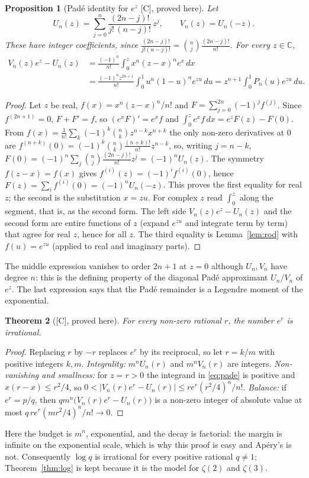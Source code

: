 \documentclass[11pt,a4paper]{article}
\newcommand{\C}{\mathbb C}
\newcommand{\dd}{\,d}
\newcommand{\st}[1]{\textsf{[#1]}}
\newtheorem{theorem}{Theorem}
\newtheorem{proposition}[theorem]{Proposition}
\theoremstyle{definition}
\begin{document}
\begin{proposition}[Pad\'e identity for $e^z$ \st{C}, proved here]\label{prop:pade}
Let
\[
U_n(z)=\sum_{j=0}^n\frac{(2n-j)!}{j!\,(n-j)!}\,z^j,\qquad V_n(z)=U_n(-z).
\]
These have integer coefficients, since $\frac{(2n-j)!}{j!(n-j)!}=\binom nj\frac{(2n-j)!}{n!}$. For
every $z\in\C$,
\begin{equation}\label{eq:pade}
\begin{aligned}
V_n(z)e^z-U_n(z)
 &=\frac{(-1)^n}{n!}\int_0^z x^n(z-x)^ne^x\dd x\\
 &=\frac{(-1)^nz^{2n+1}}{n!}\int_0^1u^n(1-u)^ne^{zu}\dd u
 =z^{n+1}\int_0^1P_n(u)e^{zu}\dd u .
\end{aligned}
\end{equation}
\end{proposition}
\begin{proof}
Let $z$ be real, $f(x)=x^n(z-x)^n/n!$ and $F=\sum_{j=0}^{2n}(-1)^jf^{(j)}$. Since $f^{(2n+1)}=0$,
$F+F'=f$, so $(e^xF)'=e^xf$ and $\int_0^ze^xf\dd x=e^zF(z)-F(0)$. From
$f(x)=\frac1{n!}\sum_k(-1)^k\binom nkz^{n-k}x^{n+k}$ the only non-zero derivatives at $0$ are
$f^{(n+k)}(0)=(-1)^k\binom nk\frac{(n+k)!}{n!}z^{n-k}$, so, writing $j=n-k$,
$F(0)=(-1)^n\sum_j\binom nj\frac{(2n-j)!}{n!}z^j=(-1)^nU_n(z)$.
The symmetry $f(z-x)=f(x)$ gives $f^{(i)}(z)=(-1)^if^{(i)}(0)$, hence
$F(z)=\sum_if^{(i)}(0)=(-1)^nU_n(-z)$. This proves the first equality for real $z$; the second is
the substitution $x=zu$. For complex $z$ read $\int_0^z$ along the segment, that is, as the second form. The left side
$V_n(z)e^z-U_n(z)$ and the second form are entire functions of $z$ (expand $e^{zu}$ and integrate term
by term) that agree for real $z$, hence for all $z$. The third equality is Lemma~\ref{lem:rod} with
$f(u)=e^{zu}$ (applied to real and imaginary parts).
\end{proof}
The middle expression vanishes to order $2n+1$ at $z=0$ although $U_n,V_n$ have degree $n$: this is
the defining property of the diagonal Pad\'e approximant $U_n/V_n$ of $e^z$. The last expression says
that the Pad\'e remainder is a Legendre moment of the exponential.

\begin{theorem}[\st{C}, proved here]\label{thm:er}
For every non-zero rational $r$, the number $e^r$ is irrational.
\end{theorem}
\begin{proof}
Replacing $r$ by $-r$ replaces $e^r$ by its reciprocal, so let $r=k/m$ with positive integers
$k,m$. \emph{Integrality:} $m^nU_n(r)$ and $m^nV_n(r)$ are integers. \emph{Non-vanishing and
smallness:} for $z=r>0$ the integrand in \eqref{eq:pade} is positive and $x(r-x)\le r^2/4$, so
$0<|V_n(r)e^r-U_n(r)|\le re^r(r^2/4)^n/n!$. \emph{Balance:} if $e^r=p/q$, then
$qm^n\bigl(V_n(r)e^r-U_n(r)\bigr)$ is a non-zero integer of absolute value at most
$q\,re^r(mr^2/4)^n/n!\to0$.
\end{proof}
Here the budget is $m^n$, exponential, and the decay is factorial: the margin is infinite on the
exponential scale, which is why this proof is easy and Ap\'ery's is not.
Consequently $\log q$ is irrational for every positive rational $q\ne1$; Theorem~\ref{thm:log} is
kept because it is the model for $\zeta(2)$ and $\zeta(3)$.
\end{document}
